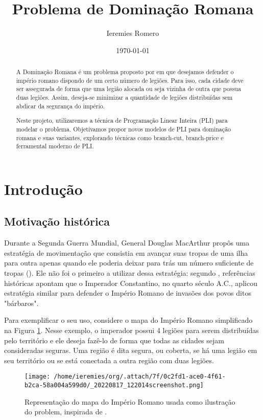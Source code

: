 \documentclass[11pt]{article}
\author{Ieremies Romero}
\date{\today}
\title{Problema de Dominação Romana}
\begin{document}
\maketitle
\begin{abstract}
A Dominação Romana é um problema proposto por \textcite{Stewart1999DefendRomanEmpire} em que desejamos defender o império romano dispondo de um certo número de legiões.
Para isso, cada cidade deve ser assegurada de forma que uma legião alocada ou seja vizinha de outra que possua duas legiões.
Assim, deseja-se minimizar a quantidade de legiões distribuídas sem abdicar da segurança do império.

Neste projeto, utilizaremos a técnica de Programação Linear Inteira (PLI) para modelar o problema.
Objetivamos propor novos modelos de PLI para dominação romana e suas variantes, explorando técnicas como branch-cut, branch-price e ferramental moderno de PLI.
\end{abstract}

\section{Introdução}
\label{sec:orgd452167}
\subsection{Motivação histórica}
\label{sec:orgc46685d}
Durante a Segunda Guerra Mundial, General Douglas MacArthur propôs uma estratégia de movimentação que consistia em avançar suas tropas de uma ilha para outra apenas quando ele poderia deixar para trás um número suficiente de tropas (\autocite{Stewart1999DefendRomanEmpire}).
Ele não foi o primeiro a utilizar dessa estratégia: segundo \textcite{Stewart1999DefendRomanEmpire}, referências históricas apontam que o Imperador Constantino, no quarto século A.C., aplicou estratégia similar para defender o Império Romano de invasões dos povos ditos "bárbaros".

Para exemplificar o seu uso, considere o mapa do Império Romano simplificado na Figura \ref{fig:mapa}.
Nesse exemplo, o imperador possui 4 legiões para serem distribuídas pelo território e ele deseja fazê-lo de forma que todas as cidades sejam consideradas seguras.
Uma região é dita segura, ou coberta, se há uma legião em seu território ou se está conectada a outra região com duas legiões.

\begin{figure}[htbp]
\centering
\texttt{[image: /home/ieremies/org/.attach/7f/0c2fd1-ace0-4f61-b2ca-58a004a599d0/\_20220817\_122014screenshot.png]}
\caption{\label{fig:mapa}Representação do mapa do Império Romano usada como ilustração do problem, inspirada de \textcite{Stewart1999DefendRomanEmpire}.}
\end{figure}
\end{document}
